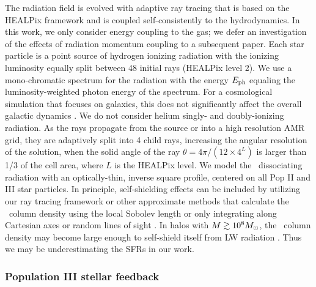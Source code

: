 \documentclass[apj]{emulateapj}
\begin{document}
The radiation field is evolved with adaptive ray tracing
\citep{Abel02_RT, Wise11_Moray} that is based on the HEALPix framework
\citep{HEALPix} and is coupled self-consistently to the hydrodynamics.
In this work, we only consider energy coupling to the gas; we defer an
investigation of the effects of radiation momentum coupling to a
subsequent paper.  Each star particle is a point source of hydrogen
ionizing radiation with the ionizing luminosity equally split between
48 initial rays (HEALPix level 2).  We use a mono-chromatic spectrum
for the radiation with the energy $E_{\rm ph}$ equaling the
luminosity-weighted photon energy of the spectrum.  For a cosmological
simulation that focuses on galaxies, this does not significantly
affect the overall galactic dynamics \citep[see Sec. 6.3
  in][]{Wise11_Moray}.  We do not consider helium singly- and
doubly-ionizing radiation.  As the rays propagate from the source or
into a high resolution AMR grid, they are adaptively split into 4
child rays, increasing the angular resolution of the solution, when
the solid angle of the ray $\theta = 4\pi/(12 \times 4^{L})$ is larger
than 1/3 of the cell area, where $L$ is the HEALPix level.  We model
the \hh~dissociating radiation with an optically-thin, inverse square
profile, centered on all Pop II and III star particles.  In principle,
self-shielding effects can be included by utilizing our ray tracing
framework or other approximate methods that calculate the \hh~column
density using the local Sobolev length \citep{Wolcott11} or only
integrating along Cartesian axes or random lines of sight
\citep{Yoshida03, Yoshida07_HII, Glover07}.  In halos with $M \ga 10^8
\Ms$, the \hh~column density may become large enough to self-shield
itself from LW radiation \citep{Wise08_Gal}.  Thus we may be
underestimating the SFRs in our work.

\subsubsection{Population III stellar feedback}
\end{document}
